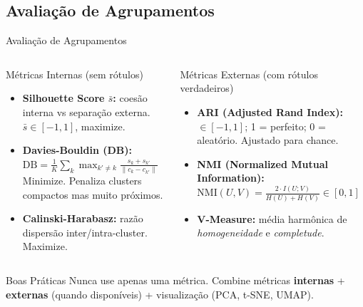 \documentclass[aspectratio=169]{beamer}
\begin{document}
\subsection{Avaliação de Agrupamentos}

\begin{frame}[shrink=5]{Avaliação de Agrupamentos}
    \begin{columns}
        \begin{block}{Métricas Internas (sem rótulos)}
            \footnotesize
            \begin{itemize}
                \item \textbf{Silhouette Score $\bar{s}$:} coesão interna vs separação externa. $\bar{s} \in [-1,1]$, maximize.
                \item \textbf{Davies-Bouldin (DB):}
                      $\text{DB} = \frac{1}{K}\sum_{k}\max_{k'\neq k}\frac{s_k+s_{k'}}{\|c_k-c_{k'}\|}$\\
                      Minimize. Penaliza clusters compactos mas muito próximos.
                \item \textbf{Calinski-Harabasz:} razão dispersão inter/intra-cluster. Maximize.
            \end{itemize}
        \end{block}
        \begin{block}{Métricas Externas (com rótulos verdadeiros)}
            \footnotesize
            \begin{itemize}
                \item \textbf{ARI (Adjusted Rand Index):} $\in [-1,1]$; 1 = perfeito; 0 = aleatório. Ajustado para chance.
                \item \textbf{NMI (Normalized Mutual Information):}
                      $\text{NMI}(U,V) = \frac{2\cdot I(U;V)}{H(U)+H(V)} \in [0,1]$
                \item \textbf{V-Measure:} média harmônica de \textit{homogeneidade} e \textit{completude}.
            \end{itemize}
        \end{block}
    \end{columns}
    \vspace{0.2cm}
    \begin{alertblock}{Boas Práticas}
        \centering\footnotesize Nunca use apenas uma métrica. Combine métricas \textbf{internas} + \textbf{externas} (quando disponíveis) + visualização (PCA, t-SNE, UMAP).
    \end{alertblock}
\end{frame}
\end{document}
